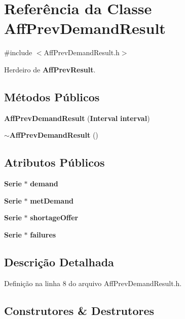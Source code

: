 \section{Referência da Classe Aff\+Prev\+Demand\+Result}
\label{class_aff_prev_demand_result}


{\ttfamily \#include $<$Aff\+Prev\+Demand\+Result.\+h$>$}



Herdeiro de {\bf Aff\+Prev\+Result}.

\subsection*{Métodos Públicos}
\begin{DoxyCompactItemize}
\item 
{\bf Aff\+Prev\+Demand\+Result} ({\bf Interval} {\bf interval})
\item 
{\bf $\sim$\+Aff\+Prev\+Demand\+Result} ()
\end{DoxyCompactItemize}
\subsection*{Atributos Públicos}
\begin{DoxyCompactItemize}
\item 
{\bf Serie} $\ast$ {\bf demand}
\item 
{\bf Serie} $\ast$ {\bf met\+Demand}
\item 
{\bf Serie} $\ast$ {\bf shortage\+Offer}
\item 
{\bf Serie} $\ast$ {\bf failures}
\end{DoxyCompactItemize}


\subsection{Descrição Detalhada}


Definição na linha 8 do arquivo Aff\+Prev\+Demand\+Result.\+h.



\subsection{Construtores \& Destrutores}
